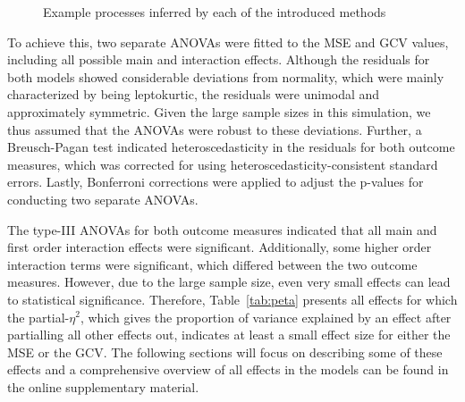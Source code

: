 \documentclass[man, floatsintext]{apa7}
\begin{document}
\begin{sidewaysfigure*}[htbp]
  \caption{Example processes inferred by each of the introduced methods}
  \label{fig:smooth}
\end{sidewaysfigure*}

To achieve this, two separate ANOVAs were fitted to the MSE and GCV values,
including all possible main and interaction effects. Although the residuals for
both models showed considerable deviations from normality, which were mainly
characterized by being leptokurtic, the residuals were unimodal and
approximately symmetric. Given the large sample sizes in this simulation, we
thus assumed that the ANOVAs were robust to these deviations. Further, a
Breusch-Pagan test indicated heteroscedasticity in the residuals for both
outcome measures, which was corrected for using heteroscedasticity-consistent
standard errors. Lastly, Bonferroni corrections were applied to adjust the
p-values for conducting two separate ANOVAs.

The type-III ANOVAs for both outcome measures indicated that all main and first
order interaction effects were significant. Additionally, some higher order
interaction terms were significant, which differed between the two outcome
measures. However, due to the large sample size, even very small effects can
lead to statistical significance. Therefore, Table~\ref{tab:peta} presents all
effects for which the partial-$\eta^2$, which gives the proportion of variance
explained by an effect after partialling all other effects out, indicates at
least a small effect size for either the MSE or the GCV\@. The following
sections will focus on describing some of these effects and a comprehensive
overview of all effects in the models can be found in the online supplementary
material.
\end{document}
